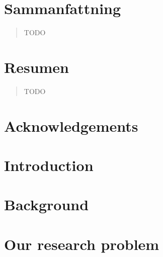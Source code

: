 \documentclass[showtrims, oldfontcommands]{kthesis}
\makeatletter
\renewcommand\tableofcontents{%
        \chapter{\contentsname
        \@mkboth{%
           \MakeUppercase\contentsname}{\MakeUppercase\contentsname}}%
        \@starttoc{toc}%
        }
\makeatother
\begin{document}
\cleardoublepage
{}
\chapter*{Sammanfattning}
\renewcommand{\abstractname}{\vspace{-\baselineskip}}
\begin{abstract}
    TODO
\end{abstract}
\clearpage

\cleardoublepage
{}
\chapter*{Resumen}
\renewcommand{\abstractname}{\vspace{-\baselineskip}}
\begin{abstract}
    TODO
\end{abstract}
\clearpage


\clearpage
{}
{}
\chapter*{Acknowledgements}
\pagestyle{headings}

\cleardoublepage

\clearforchapter
\tableofcontents
\cleardoublepage

\mainmatter

%
\cleardoublepage
\chapter{Introduction}
    \label{chapter:thesis:introduction}

\clearpage

%
\cleardoublepage
\chapter{Background}
    \label{chapter:thesis:background}

\clearpage

\chapter{Our research problem}
    \label{chapter:thesis:our-research-problem}
\end{document}
